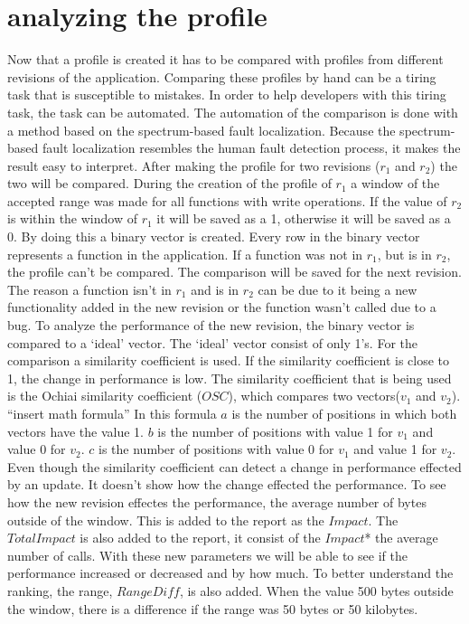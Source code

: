 \section*{analyzing the profile}
Now that a profile is created it has to be compared with profiles from different revisions of the application. Comparing these profiles by hand can be a tiring task that is susceptible to mistakes. In order to help developers with this tiring task, the task can be automated. The automation of the comparison is done with a method based on the spectrum-based fault localization. Because the spectrum-based fault localization resembles the human fault detection process, it makes the result easy to interpret. \newline
After making the profile for two revisions ($r_1$ and $r_2$) the two will be compared. During the creation of the profile of $r_1$ a window of the accepted range was made for all functions with write operations. If the value of $r_2$  is within the window of $r_1$ it will be saved as a 1, otherwise it will be saved as a 0. By doing this a binary vector is created. Every row in the binary vector represents a function in the application. If a function was not in $r_1$, but is in $r_2$, the profile can't be compared. The comparison will be saved for the next revision. The reason a function isn't in $r_1$ and is in $r_2$ can be due to it being a new functionality added in the new revision or the function wasn't called due to a bug. \newline
To analyze the performance of the new revision, the binary vector is compared to a `ideal' vector. The `ideal' vector consist of only 1's. For the comparison a similarity coefficient is used. If the similarity coefficient is close to 1, the change in performance is low. The similarity coefficient that is being used is the Ochiai similarity coefficient ($OSC$), which compares two vectors($v_1$ and $v_2$).\newline
\newline
``insert math formula'' \newline
\newline
In this formula $a$ is the number of positions in which both vectors have the value 1. $b$ is the number of positions with value 1 for $v_1$ and value 0 for $v_2$. $c$ is the number of positions with value 0 for $v_1$ and value 1 for $v_2$.\newline
Even though the similarity coefficient can detect a change in performance effected by an update. It doesn't show how the change effected the performance. To see how the new revision effectes the performance, the average number of bytes outside of the window. This is added to the report as the $Impact$. The $TotalImpact$ is also added to the report, it consist of the $Impact$* the average number of calls. With these new parameters we will be able to see if the performance increased or decreased and by how much. To better understand the ranking, the range, $RangeDiff$, is also added. When the value 500 bytes outside the window, there is a difference if the range was 50 bytes or 50 kilobytes. \newline
